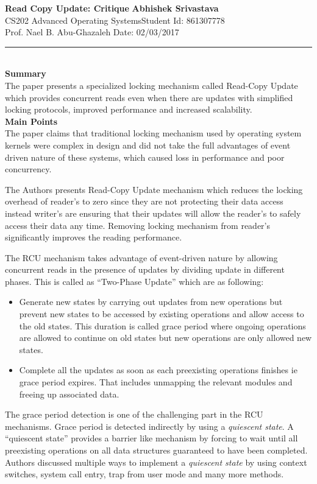 \documentclass[a4paper, 11pt]{article}
\begin{document}
\noindent
\large\textbf{Read Copy Update: Critique} \hfill \textbf{Abhishek Srivastava} \\
\normalsize CS202 Advanced Operating Systems\hfill Student Id: 861307778 \\
Prof. Nael B. Abu-Ghazaleh \hfill Date: 02/03/2017 \\
\hrule

\noindent
\\
\large\textbf{Summary}\\
The paper presents a specialized locking mechanism called Read-Copy Update which provides concurrent reads even when there are updates with simplified locking protocols, improved performance and increased scalability.\\

\noindent
\large\textbf{Main Points}\\
The paper claims that traditional locking mechanism used by operating system kernels were complex in design and did not take the full advantages of event driven nature of these systems, which caused loss in performance and poor concurrency. 

The Authors presents Read-Copy Update mechanism which reduces the locking overhead of reader's to zero since they are not protecting their data access instead writer's are ensuring that their updates will allow the reader's to safely access their data any time. Removing locking mechanism from reader's significantly improves the reading performance.

The RCU mechanism takes advantage of event-driven nature by allowing concurrent reads in the presence of updates by dividing update in different phases. This is called as ``Two-Phase Update'' which are as following:
\begin{itemize}
	\item Generate new states by carrying out updates from new operations but prevent new states to be accessed by existing operations and allow access to the old states. This duration is called grace period where ongoing operations are allowed to continue on old states but new operations are only allowed new states.  
	\item Complete all the updates as soon as each preexisting operations finishes ie grace period expires. That includes unmapping the relevant modules and freeing up associated data.
\end{itemize}
The grace period detection is one of the challenging part in the RCU mechanisms. Grace period is detected indirectly by using a \emph{quiescent state}. A ``quiescent state'' provides a barrier like mechanism by forcing to wait until all preexisting operations on all data structures guaranteed to have been completed. Authors discussed multiple ways to implement a \emph{quiescent state} by using context switches, system call entry, trap from user mode and many more methods.
\end{document}
